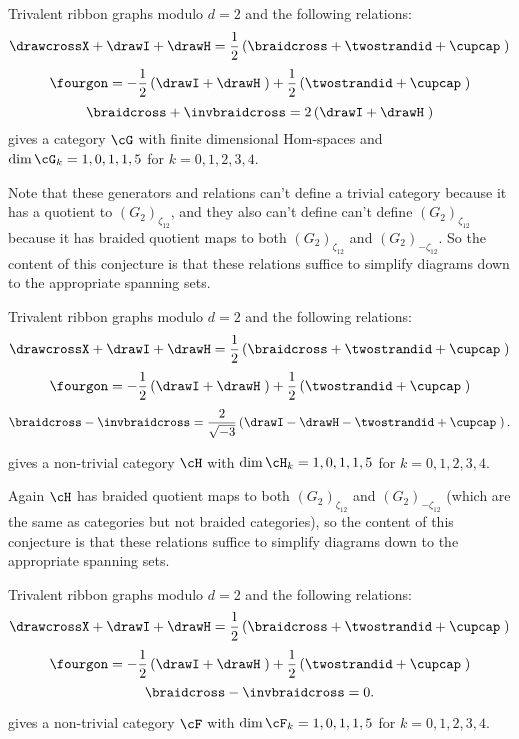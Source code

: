 \documentclass[12pt]{amsart}
\begin{document}
\begin{conjecture}
Trivalent ribbon graphs modulo $d=2$ and the following relations:
$$\drawcrossX + \drawI + \drawH = \frac{1}{2} \left(\braidcross + \twostrandid + \cupcap \;\right)$$
$$\fourgon = -\frac{1}{2} \left(\drawI + \drawH \;\right) + \frac{1}{2} \left(\twostrandid + \cupcap\;\right)$$
$$\braidcross + \invbraidcross = 2 \left(\drawI + \drawH \;\right)$$
gives a category $\cG$ with finite dimensional Hom-spaces and $\dim \cG_k = 1,0,1,1,5$ for $k = 0,1,2,3,4$.  
\end{conjecture}

Note that these generators and relations can't define a trivial category
because it has a quotient to  $(G_2)_{\zeta_{12}}$, and they also can't define
can't define $(G_2)_{\zeta_{12}}$ because it has braided quotient maps to both
$(G_2)_{\zeta_{12}}$ and $(G_2)_{-\zeta_{12}}$.  So the content of this conjecture
is that these relations suffice to simplify diagrams down to the appropriate
spanning sets.

\begin{conjecture}
Trivalent ribbon graphs modulo $d=2$ and the following relations:
$$\drawcrossX + \drawI + \drawH = \frac{1}{2} \left(\braidcross + \twostrandid + \cupcap \;\right)$$
$$\fourgon = -\frac{1}{2} \left(\drawI + \drawH \;\right) + \frac{1}{2} \left(\twostrandid + \cupcap\;\right)$$
$$\braidcross - \invbraidcross = \frac{2}{\sqrt{-3}} \left(\drawI - \drawH - \twostrandid + \cupcap\;\right).$$

gives a non-trivial category $\cH$ with $\dim \cH_k = 1,0,1,1,5$ for $k = 0,1,2,3,4$.  
\end{conjecture}

Again $\cH$ has braided quotient maps to both $(G_2)_{\zeta_{12}}$ and
$(G_2)_{-\zeta_{12}}$ (which are the same as categories but not braided
categories), so the content of this conjecture is that these relations suffice
to simplify diagrams down to the appropriate spanning sets.

\begin{conjecture}
Trivalent ribbon graphs modulo $d=2$ and the following relations:
$$\drawcrossX + \drawI + \drawH = \frac{1}{2} \left(\braidcross + \twostrandid + \cupcap \;\right)$$
$$\fourgon = -\frac{1}{2} \left(\drawI + \drawH \;\right) + \frac{1}{2} \left(\twostrandid + \cupcap\;\right)$$
$$\braidcross - \invbraidcross = 0.$$

gives a non-trivial category $\cF$ with $\dim \cF_k = 1,0,1,1,5$ for $k = 0,1,2,3,4$.
\end{conjecture}
\end{document}

